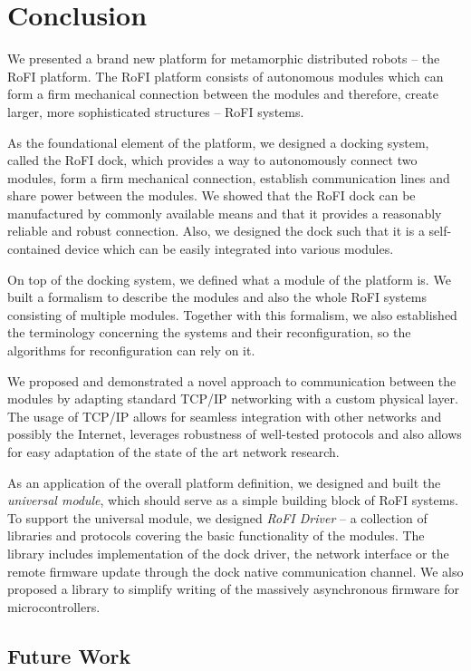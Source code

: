 \chapter{Conclusion}\label{chap:conclusion}

We presented a brand new platform for metamorphic distributed robots -- the RoFI
platform. The RoFI platform consists of autonomous modules which can form a
firm mechanical connection between the modules and therefore, create larger,
more sophisticated structures -- RoFI systems.

As the foundational element of the platform, we designed a docking system,
called the RoFI dock, which provides a way to autonomously connect two modules,
form a firm mechanical connection, establish communication lines and share power
between the modules. We showed that the RoFI dock can be manufactured by
commonly available means and that it provides a reasonably reliable and robust
connection. Also, we designed the dock such that it is a self-contained device
which can be easily integrated into various modules.

On top of the docking system, we defined what a module of the platform is. We
built a formalism to describe the modules and also the whole RoFI systems
consisting of multiple modules. Together with this formalism, we also
established the terminology concerning the systems and their reconfiguration, so
the algorithms for reconfiguration can rely on it.

We proposed and demonstrated a novel approach to communication between the
modules by adapting standard TCP/IP networking with a custom physical layer. The
usage of TCP/IP allows for seamless integration with other networks and possibly
the Internet, leverages robustness of well-tested protocols and also allows for
easy adaptation of the state of the art network research.

As an application of the overall platform definition, we designed and built the
\emph{universal module}, which should serve as a simple building block of RoFI
systems. To support the universal module, we designed \emph{RoFI Driver} -- a
collection of libraries and protocols covering the basic functionality of the
modules. The library includes implementation of the dock driver, the network
interface or the remote firmware update through the dock native communication
channel. We also proposed a library to simplify writing of the massively
asynchronous firmware for microcontrollers.

\section{Future Work}

